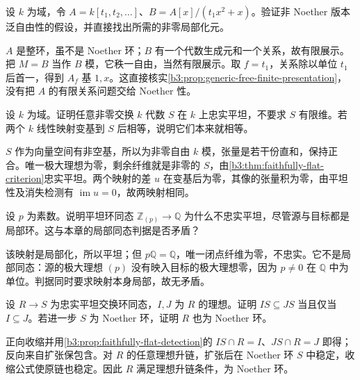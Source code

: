 \begin{exercise}\label{b3:ex:12-nonnoether-finite-presentation}
	设 \(k\) 为域，令 \(A=k[t_1,t_2,\ldots]\)、\(B=A[x]/(t_1x^2+x)\)。验证非 Noether 版本泛自由性的假设，并直接找出所需的非零局部化元。
\end{exercise}
\begin{solution}
	\(A\) 是整环，虽不是 Noether 环；\(B\) 有一个代数生成元和一个关系，故有限展示。把 \(M=B\) 当作 \(B\) 模，它秩一自由，当然有限展示。取 \(f=t_1\)，关系除以单位 \(t_1\) 后首一，得到 \(A_f\) 基 \(1,x\)。这直接核实\cref{b3:prop:generic-free-finite-presentation}，没有把 \(A\) 的有限关系问题交给 Noether 性。
\end{solution}

\begin{exercise}\label{b3:ex:12-faithful-field-extension}
	设 \(k\) 为域。证明任意非零交换 \(k\) 代数 \(S\) 在 \(k\) 上忠实平坦，不要求 \(S\) 有限维。若两个 \(k\) 线性映射变基到 \(S\) 后相等，说明它们本来就相等。
\end{exercise}
\begin{solution}
	\(S\) 作为向量空间有非空基，所以为非零自由 \(k\) 模，张量是若干份直和，保持正合。唯一极大理想为零，剩余纤维就是非零的 \(S\)，由\cref{b3:thm:faithfully-flat-criterion}忠实平坦。两个映射的差 \(u\) 在变基后为零，其像的张量积为零，由平坦性及消失检测有 \(\operatorname{im}u=0\)，故两映射相同。
\end{solution}

\begin{exercise}\label{b3:ex:12-local-flat-not-local}
	设 \(p\) 为素数。说明平坦环同态 \(\mathbb Z_{(p)}\to\mathbb Q\) 为什么不忠实平坦，尽管源与目标都是局部环。这与本章的局部同态判据是否矛盾？
\end{exercise}
\begin{solution}
	该映射是局部化，所以平坦；但 \(p\mathbb Q=\mathbb Q\)，唯一闭点纤维为零，不忠实。它不是局部同态：源的极大理想 \((p)\) 没有映入目标的极大理想零，因为 \(p\ne0\) 在 \(\mathbb Q\) 中为单位。判据同时要求映射本身局部，故无矛盾。
\end{solution}

\begin{exercise}\label{b3:ex:12-faithful-ideal-contraction}
	设 \(R\to S\) 为忠实平坦交换环同态，\(I,J\) 为 \(R\) 的理想。证明 \(IS\subseteq JS\) 当且仅当 \(I\subseteq J\)。若进一步 \(S\) 为 Noether 环，证明 \(R\) 也为 Noether 环。
\end{exercise}
\begin{solution}
	正向收缩并用\cref{b3:prop:faithfully-flat-detection}的 \(IS\cap R=I\)、\(JS\cap R=J\) 即得；反向来自扩张保包含。对 \(R\) 的任意理想升链，扩张后在 Noether 环 \(S\) 中稳定，收缩公式使原链也稳定。因此 \(R\) 满足理想升链条件，为 Noether 环。
\end{solution}

